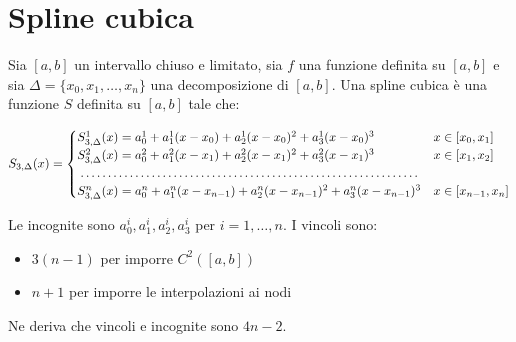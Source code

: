 \section{Spline cubica}
Sia $[a, b]$ un intervallo chiuso e limitato, sia $f$ una funzione definita su $[a, b]$ e sia $\Delta = \{x_0, x_1, \dots, x_n\}$ una decomposizione di $[a, b]$. Una spline cubica è una funzione $S$ definita su $[a, b]$ tale che:

\begin{align}
  S_{3, \Delta}(x) = \begin{cases}
    S_{3, \Delta}^1(x) = a^1_0 + a^1_1(x - x_0) + a^1_2(x - x_0)^2 + a^1_3(x - x_0)^3 & x \in [x_0, x_1] \\
    S_{3, \Delta}^2(x) = a^2_0 + a^2_1(x - x_1) + a^2_2(x - x_1)^2 + a^2_3(x - x_1)^3 & x \in [x_1, x_2] \\
    \dotfill \\
    S_{3, \Delta}^n(x) = a^n_0 + a^n_1(x - x_{n-1}) + a^n_2(x - x_{n-1})^2 + a^n_3(x - x_{n-1})^3 & x \in [x_{n-1}, x_{n}]
  \end{cases}
\end{align}


Le incognite sono $a^i_0, a^i_1, a^i_2, a^i_3$ per $i = 1, \dots, n$.
I vincoli sono:
\begin{itemize}
  \item $3(n-1)$ per imporre $C^2([a, b])$
  \item $n+1$ per imporre le interpolazioni ai nodi
\end{itemize}


Ne deriva che vincoli e incognite sono $4n - 2$.
